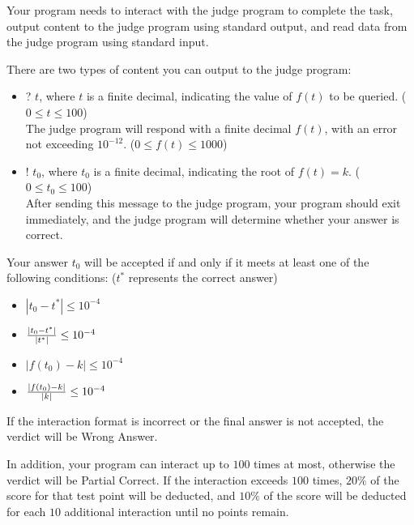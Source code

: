 Your program needs to interact with the judge program to complete the task, output content to the judge program using standard output, and read data from the judge program using standard input.

There are two types of content you can output to the judge program:

\begin{itemize}
\item ? $t$, where $t$ is a finite decimal, indicating the value of $f(t)$ to be queried. ($0 \le t \le 100$) \\
The judge program will respond with a finite decimal $f(t)$, with an error not exceeding $10^{-12}$. ($0 \le f(t) \le 1000$)
\item ! $t_0$, where $t_0$ is a finite decimal, indicating the root of $f(t) = k$. ($0 \le t_0 \le 100$) \\
After sending this message to the judge program, your program should exit immediately, and the judge program will determine whether your answer is correct.
\end{itemize}

Your answer $t_0$ will be accepted if and only if it meets at least one of the following conditions: ($t^*$ represents the correct answer)
\begin{itemize}
\item $|t_0 - t^*| \le 10^{-4}$
\item ${|t_0 - t^*| \over |t^*|} \le 10^{-4}$
\item $|f(t_0) - k| \le 10^{-4}$
\item ${|f(t_0) - k| \over |k|} \le 10^{-4}$
\end{itemize}

If the interaction format is incorrect or the final answer is not accepted, the verdict will be Wrong Answer.

In addition, your program can interact up to $100$ times at most, otherwise the verdict will be Partial Correct. If the interaction exceeds $100$ times, $20\%$ of the score for that test point will be deducted, and $10\%$ of the score will be deducted for each $10$ additional interaction until no points remain.